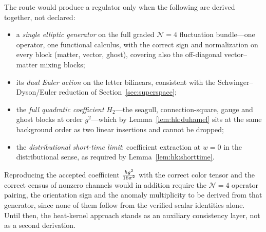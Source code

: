The route would produce a regulator only when the following are derived
together, not declared:
\begin{itemize}
\item a \emph{single elliptic generator} on the full graded $\mathcal N=4$
fluctuation bundle---one operator, one functional calculus, with the correct
sign and normalization on every block (matter, vector, ghost), covering also
the off-diagonal vector--matter mixing blocks;
\item its \emph{dual Euler action} on the letter bilinears, consistent with
the Schwinger--Dyson/Euler reduction of Section~\ref{sec:superspace};
\item the \emph{full quadratic coefficient} $H_2$---the seagull,
connection-square, gauge and ghost blocks at order $g^2$---which by
Lemma~\ref{lem:hk:duhamel} sits at the same background order as two linear
insertions and cannot be dropped;
\item the \emph{distributional short-time limit}: coefficient extraction at
$w=0$ in the distributional sense, as required by Lemma~\ref{lem:hk:shorttime}.
\end{itemize}
Reproducing the accepted coefficient $\frac{\hbar g^2}{16\pi^2}$ with the correct
color tensor and the correct census of nonzero channels would in addition
require the $\mathcal N=4$ operator pairing, the orientation sign and the
anomaly multiplicity to be derived from that generator, since none of them
follow from the verified scalar identities alone. Until then, the heat-kernel
approach stands as an auxiliary consistency layer, not as a second derivation.
